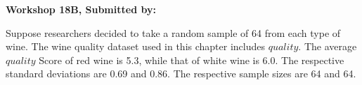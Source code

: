 \documentclass[11pt, chapterprefix=true]{scrbook}\usepackage[]{graphicx}\usepackage[]{color}
\begin{document}
\begin{exercises}
\begin{exercise}
\end{exercise} 
\begin{solution}  %


\end{solution}

\clearpage

    \begin{exercise}  %



    \begin{center}
\begin{flushleft}\textbf{\large \hfill Workshop 18B, Submitted by: }\end{flushleft}

\end{center}

Suppose researchers decided to take a random sample of 64 from each type of wine.  The wine quality dataset used in this chapter includes $quality$. The average $quality$ Score of red wine is 5.3, while that of white wine is 6.0. The respective standard deviations are 0.69 and 0.86. The respective sample sizes are 64 and 64.


\end{exercise}
\end{exercises}
\end{document}
